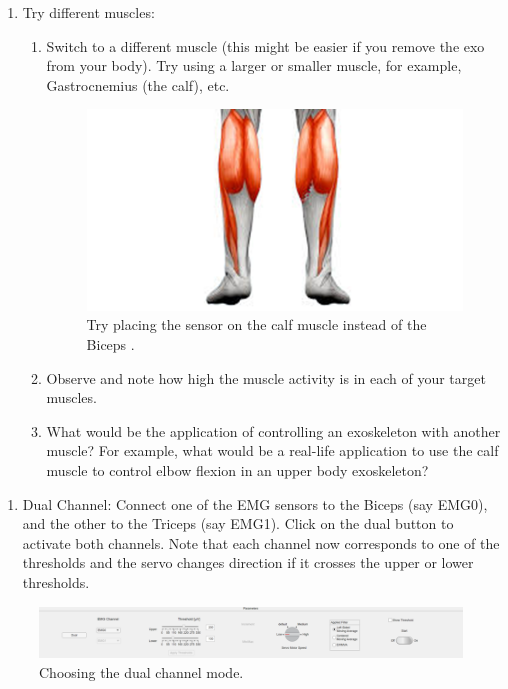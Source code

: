 	 
\begin{enumerate}[]
	\item Try different muscles:
	\begin{enumerate}[]
		\item Switch to a different muscle (this might be easier if you remove the exo from your body). Try using a larger or smaller muscle, for example, Gastrocnemius (the calf), etc. 
		\begin{figure}
			\centering
			\includegraphics[width=0.7\linewidth]{img/fig_21}
			\caption{Try placing the sensor on the calf muscle instead of the Biceps \cite{Walden2022}.}
			\label{fig:fig21}
		\end{figure}
		\item Observe and note how high the muscle activity is in each of your target muscles. 
		\item What would be the application of controlling an exoskeleton with another muscle? For example, what would be a real-life application to use the calf muscle to control elbow flexion in an upper body exoskeleton? 
	\end{enumerate}
\end{enumerate}
	

\begin{enumerate}[]
	\item Dual Channel: Connect one of the EMG sensors to the Biceps (say EMG0), and the other to the Triceps (say EMG1). Click on the dual button to activate both channels. Note that each channel now corresponds to one of the thresholds and the servo changes direction if it crosses the upper or lower thresholds. 
\end{enumerate}


\begin{figure}
	\centering
	\includegraphics[width=1\linewidth]{img/fig_22}
	\caption{Choosing the dual channel mode. }
	\label{fig:fig22}
\end{figure}


